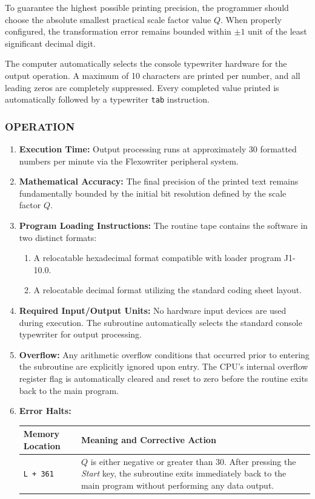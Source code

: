To guarantee the highest possible printing precision, the programmer should choose the absolute smallest practical scale factor value $Q$. When properly configured, the transformation error remains bounded within $\pm 1$ unit of the least significant decimal digit.

The computer automatically selects the console typewriter hardware for the output operation. A maximum of 10 characters are printed per number, and all leading zeros are completely suppressed. Every completed value printed is automatically followed by a typewriter \texttt{tab} instruction.

\subsubsection*{OPERATION}
\begin{enumerate}
    \item \textbf{Execution Time:} Output processing runs at approximately 30 formatted numbers per minute via the Flexowriter peripheral system.
    \item \textbf{Mathematical Accuracy:} The final precision of the printed text remains fundamentally bounded by the initial bit resolution defined by the scale factor $Q$.
    \item \textbf{Program Loading Instructions:} The routine tape contains the software in two distinct formats:
    \begin{enumerate}[label=\alph*)]
        \item A relocatable hexadecimal format compatible with loader program J1-10.0.
        \item A relocatable decimal format utilizing the standard coding sheet layout.
    \end{enumerate}
    \item \textbf{Required Input/Output Units:} No hardware input devices are used during execution. The subroutine automatically selects the standard console typewriter for output processing.
    \item \textbf{Overflow:} Any arithmetic overflow conditions that occurred prior to entering the subroutine are explicitly ignored upon entry. The CPU's internal overflow register flag is automatically cleared and reset to zero before the routine exits back to the main program.
    \item \textbf{Error Halts:}
    \begin{center}
    \begin{tabularx}{\textwidth}{lX}
        \toprule
        \textbf{Memory Location} & \textbf{Meaning and Corrective Action} \\
        \midrule
        \texttt{L + 361}         & $Q$ is either negative or greater than 30. After pressing the \textit{Start} key, the subroutine exits immediately back to the main program without performing any data output. \\
        \bottomrule
    \end{tabularx}
    \end{center}
\end{enumerate}

